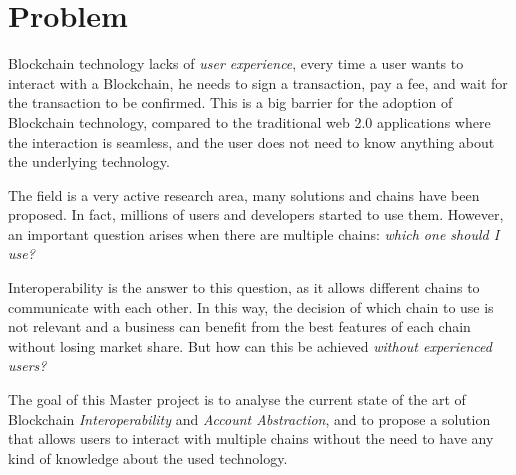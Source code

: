 \chapter{Problem}
\label{chap:problem}

Blockchain technology lacks of \textit{user experience}, every time a user wants to interact with a Blockchain, he needs to sign a transaction, pay a fee, and wait for the transaction to be confirmed. This is a big barrier for the adoption of Blockchain technology, compared to the traditional web 2.0 applications where the interaction is seamless, and the user does not need to know anything about the underlying technology. 

The field is a very active research area, many solutions and chains have been proposed. In fact, millions of users and developers started to use them. \cite{blockchain-statistics} However, an important question arises when there are multiple chains: \textit{which one should I use?}

Interoperability is the answer to this question, as it allows different chains to communicate with each other. In this way, the decision of which chain to use is not relevant and a business can benefit from the best features of each chain without losing market share. But how can this be achieved \textit{without experienced users?}

The goal of this Master project is to analyse the current state of the art of Blockchain \textit{Interoperability} and \textit{Account Abstraction}, and to propose a solution that allows users to interact with multiple chains without the need to have any kind of knowledge about the used technology.
